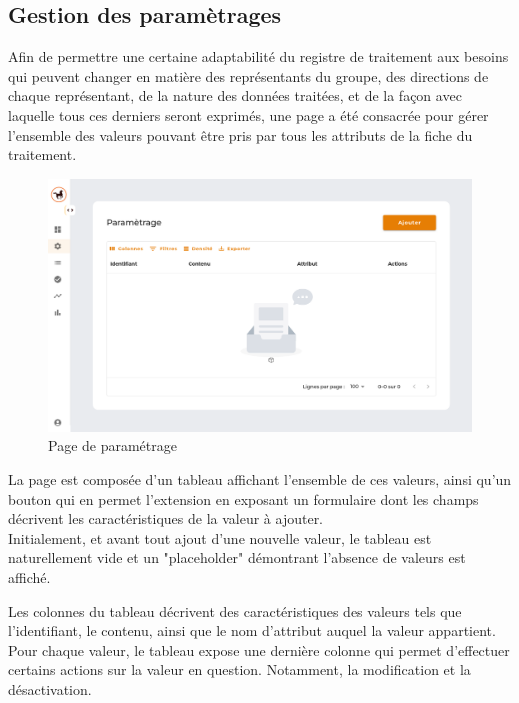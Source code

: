 \clearpage



\subsection{Gestion des paramètrages}

\noindent Afin de permettre une certaine adaptabilité du registre de traitement aux besoins qui peuvent changer en matière des représentants du groupe, des directions de chaque représentant, de la nature des données traitées, et de la façon avec laquelle tous ces derniers seront exprimés, une page a été consacrée pour gérer l'ensemble des valeurs pouvant être pris par tous les attributs de la fiche du traitement. \\


\begin{figure}[H]
    \centering
    \includegraphics[width=\textwidth]{images/guis/parametrage/initial.png}
    \caption{Page de paramétrage}
\end{figure}

\vspace{.2cm}

\noindent La page est composée d'un tableau affichant l'ensemble de ces valeurs, ainsi qu'un bouton qui en permet l'extension en exposant un formulaire dont les champs décrivent les caractéristiques de la valeur à ajouter. \\

\noindent Initialement, et avant tout ajout d'une nouvelle valeur, le tableau est naturellement vide et un "placeholder" démontrant l'absence de valeurs est affiché.

\noindent Les colonnes du tableau décrivent des caractéristiques des valeurs tels que l'identifiant, le contenu, ainsi que le nom d'attribut auquel la valeur appartient. Pour chaque valeur, le tableau expose une dernière colonne qui permet d'effectuer certains actions sur la valeur en question. Notamment, la modification et la désactivation. \\

